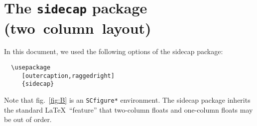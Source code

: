 \documentclass[12pt,a4paper,twocolumn,twoside,draft]{article}
\begin{document}
\section*{\centering The \texttt{sidecap} package (two~column~layout)}

In this document, we used the following options of the \textsf{sidecap} package:
%
\begin{verbatim}
  \usepackage
     [outercaption,raggedright]
     {sidecap}
\end{verbatim}
%
Note that fig.~\ref{fig:B} is an \verb|SCfigure*| environment.
The \textsf{sidecap} package inherits the standard \LaTeX\ ``feature''
that two-column floats and one-column floats may be out of order.

\begin{figure}[bhp]
  \centering
  \caption[\SHORTCAPi]{\CAPi}\label{fig:A}%
\end{figure}

\begin{SCfigure*}[50] %
  \caption[\SHORTCAPi]{\CAPi}\label{fig:B}%
\end{SCfigure*}

\begin{SCfigure}[1.2][bhp]
  \caption[\SHORTCAPi]{\CAPi}\label{fig:C}%
\end{SCfigure}

\begin{SCfigure}[][bhp]
  \caption[\SHORTCAPi]{\CAPi}\label{fig:D}%
\end{SCfigure}

\begin{SCtable}
  \caption[\SHORTCAPi]{\CAPi}\label{tab:A}%
\end{SCtable}

\begin{table}
  \centering
  \caption[\SHORTCAPi]{\CAPii}\label{tab:B}%
  \TABi%
\end{table}

\begin{SCtable}
  \caption[\SHORTCAPi]{\CAPi\CAPii}\label{tab:C}%
  \TABi%
\end{SCtable}


\begin{SCfigure}[50][b]
  \caption[\SHORTCAPi]{\CAPi}\label{fig:E}%
\end{SCfigure}

\clearpage


\begin{SCfigure}[50][b]
  \caption[\SHORTCAPi]{\CAPi}\label{fig:F}%
\end{SCfigure}
\end{document}

